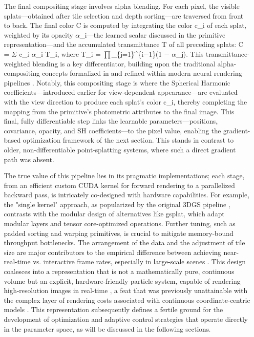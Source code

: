 \documentclass[11pt,a4paper]{article}
\begin{document}
The final compositing stage involves alpha blending. For each pixel, the visible splats---obtained after tile selection and depth sorting---are traversed from front to back. The final color C is computed by integrating the color c\_i of each splat, weighted by its opacity $\alpha$\_i---the learned scalar discussed in the primitive representation---and the accumulated transmittance T of all preceding splats: C = $\Sigma$ c\_i $\alpha$\_i T\_i, where T\_i = $\prod$\_\{j=1\}\textasciicircum{}\{i$-$1\}(1 $-$ $\alpha$\_j). This transmittance-weighted blending is a key differentiator, building upon the traditional alpha-compositing concepts formalized in \cite{arxiv:1412.4102v1} and refined within modern neural rendering pipelines \cite{arxiv:2207.01164v1}. Notably, this compositing stage is where the Spherical Harmonic coefficients---introduced earlier for view-dependent appearance---are evaluated with the view direction to produce each splat's color c\_i, thereby completing the mapping from the primitive's photometric attributes to the final image. This final, fully differentiable step links the learnable parameters---positions, covariance, opacity, and SH coefficients---to the pixel value, enabling the gradient-based optimization framework of the next section. This stands in contrast to older, non-differentiable point-splatting systems, where such a direct gradient path was absent.

The true value of this pipeline lies in its pragmatic implementations; each stage, from an efficient custom CUDA kernel for forward rendering to a parallelized backward pass, is intricately co-designed with hardware capabilities. For example, the "single kernel" approach, as popularized by the original 3DGS pipeline \cite{arxiv:2308.04079v1}, contrasts with the modular design of alternatives like gsplat, which adapt modular layers and tensor core-optimized operations. Further tuning, such as padded sorting and warping primitives, is crucial to mitigate memory-bound throughput bottlenecks. The arrangement of the data and the adjustment of tile size are major contributors to the empirical difference between achieving near-real-time vs. interactive frame rates, especially in large-scale scenes \cite{arxiv:2406.12080v1}. This design coalesces into a representation that is not a mathematically pure, continuous volume but an explicit, hardware-friendly particle system, capable of rendering high-resolution images in real-time \cite{arxiv:2311.12198v3}, a feat that was previously unattainable with the complex layer of rendering costs associated with continuous coordinate-centric models \cite{arxiv:1911.13225v2}. This representation subsequently defines a fertile ground for the development of optimization and adaptive control strategies that operate directly in the parameter space, as will be discussed in the following sections.
\end{document}

